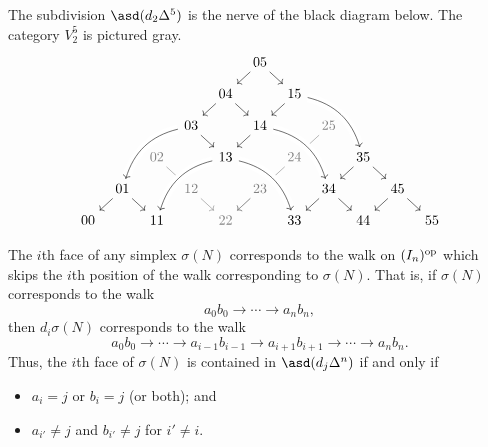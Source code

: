 \documentclass[main.tex]{subfiles}
\begin{document}
\begin{example}
  The subdivision $\asd(d_{2} \Delta^{5})$ is the nerve of the black diagram below. The category $V^{5}_{2}$ is pictured gray.
  \begin{equation*}
    \begin{tikzcd}[column sep=tiny, row sep=small]
      &&&&& 05
      \arrow[dl]
      \arrow[dr]
      \\
      &&&& 04
      \arrow[dl]
      \arrow[dr]
      && 15
      \arrow[dl]
      \\
      &&& 03
      \arrow[ddll, bend right, crossing over]
      \arrow[dr]
      && 14
      \arrow[dl]
      && \color{gray}{25}
      \arrow[dl, gray]
      \\
      && \color{gray}{02}
      \arrow[dr, gray]
      && 13
      \arrow[ddll, bend right, crossing over]
      && \color{gray}{24}
      \arrow[dl, gray]
      && 35
      \arrow[dl]
      \arrow[from=uull, bend left, crossing over]
      \arrow[dr]
      \\
      & 01
      \arrow[dl]
      \arrow[dr]
      && \color{gray}{12}
      \arrow[dr, gray]
      && \color{gray}{23}
      \arrow[dl, gray]
      && 34
      \arrow[from=uull, bend left, crossing over]
      \arrow[dl]
      \arrow[dr]
      && 45
      \arrow[dl]
      \arrow[dr]
      \\
      00
      && 11
      && \color{gray}{22}
      \arrow[from=ur, gray]
      && 33
      \arrow[from=uull, bend left, crossing over]
      && 44
      && 55
    \end{tikzcd}
  \end{equation*}
\end{example}

The $i$th face of any simplex $\sigma(N)$ corresponds to the walk on $(I_{n})^{\mathrm{op}}$ which skips the $i$th position of the walk corresponding to $\sigma(N)$. That is, if $\sigma(N)$ corresponds to the walk
\begin{equation*}
  a_{0}b_{0} \to \cdots \to a_{n} b_{n},
\end{equation*}
then $d_{i} \sigma(N)$ corresponds to the walk
\begin{equation*}
  a_{0}b_{0} \to \cdots \to a_{i-1}b_{i-1} \to a_{i+1}b_{i+1} \to \cdots \to a_{n}b_{n}.
\end{equation*}
Thus, the $i$th face of $\sigma(N)$ is contained in $\asd(d_{j} \Delta^{n})$ if and only if
\begin{itemize}
  \item $a_{i} = j$ or $b_{i} = j$ (or both); and 

  \item $a_{i'} \neq j$ and $b_{i'} \neq j$ for $i' \neq i$.
\end{itemize}
\end{document}
